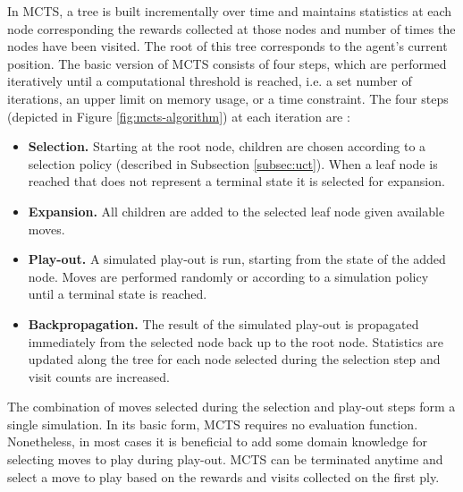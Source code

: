 \documentclass{ecai2014}
\begin{document}
In MCTS, a tree is built incrementally over time and maintains statistics at each node corresponding the rewards collected at those nodes and number of times the nodes have been visited. The root of this tree corresponds to the agent's current position. The basic version of MCTS consists of four steps, which are performed iteratively until a computational threshold is reached, i.e. a set number of iterations, an upper limit on memory usage, or a time constraint. The four steps (depicted in Figure \ref{fig:mcts-algorithm}) at each iteration are \cite{chaslot2008progressive}:
\begin{itemize}
\item {\bf Selection.} Starting at the root node, children are chosen according to a selection policy (described in Subsection \ref{subsec:uct}). When a leaf node is reached that does not represent a terminal state it is selected for expansion.
\item {\bf Expansion.} All children are added to the selected leaf node given available moves.
\item {\bf Play-out.} A simulated play-out is run, starting from the state of the added node. Moves are performed randomly or according to a simulation policy until a terminal state is reached.
\item {\bf Backpropagation.} The result of the simulated play-out is propagated immediately from the selected node back up to the root node. Statistics are updated along the tree for each node selected during the selection step and visit counts are increased.
\end{itemize}
The combination of moves selected during the selection and play-out steps form a single simulation. In its basic form, MCTS requires no evaluation function. Nonetheless, in most cases it is beneficial to add some domain knowledge for selecting moves to play during play-out. MCTS can be terminated anytime and select a move to play based on the rewards and visits collected on the first ply.

\end{document}
